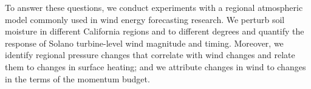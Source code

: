 To answer these questions, we conduct experiments with a regional atmospheric model commonly used in wind energy forecasting research.  We perturb soil moisture in different California regions and to different degrees and quantify the response of Solano turbine-level wind magnitude and timing.  Moreover, we identify regional pressure changes that correlate with wind changes and relate them to changes in surface heating; and we attribute changes in wind to changes in the terms of the momentum budget.

%